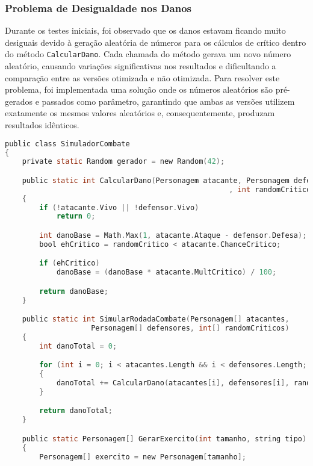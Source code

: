 \documentclass[
	12pt,				%
	oneside,			%
	a4paper,			%
	english,			%
	brazil,				%
	]{abntex2}
\begin{document}
{\subsubsection{Problema de Desigualdade nos Danos}
Durante os testes iniciais, foi observado que os danos estavam ficando muito desiguais devido à geração aleatória de números para os cálculos de crítico dentro do método \texttt{CalcularDano}. Cada chamada do método gerava um novo número aleatório, causando variações significativas nos resultados e dificultando a comparação entre as versões otimizada e não otimizada.
Para resolver este problema, foi implementada uma solução onde os números aleatórios são pré-gerados e passados como parâmetro, garantindo que ambas as versões utilizem exatamente os mesmos valores aleatórios e, consequentemente, produzam resultados idênticos.
\begin{lstlisting}[language=C]
public class SimuladorCombate
{
    private static Random gerador = new Random(42);

    public static int CalcularDano(Personagem atacante, Personagem defensor
                                                    , int randomCritico)
    {
        if (!atacante.Vivo || !defensor.Vivo)
            return 0;

        int danoBase = Math.Max(1, atacante.Ataque - defensor.Defesa);
        bool ehCritico = randomCritico < atacante.ChanceCritico;

        if (ehCritico)
            danoBase = (danoBase * atacante.MultCritico) / 100;

        return danoBase;
    }

    public static int SimularRodadaCombate(Personagem[] atacantes,
                    Personagem[] defensores, int[] randomCriticos)
    {
        int danoTotal = 0;

        for (int i = 0; i < atacantes.Length && i < defensores.Length; i++)
        {
            danoTotal += CalcularDano(atacantes[i], defensores[i], randomCriticos[i]);
        }

        return danoTotal;
    }

    public static Personagem[] GerarExercito(int tamanho, string tipo)
    {
        Personagem[] exercito = new Personagem[tamanho];


\end{lstlisting}}
\end{document}
